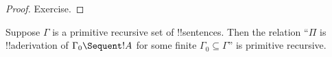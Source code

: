 \documentclass[../../include/open-logic-section]{subfiles}
\begin{document}
\begin{proof}
Exercise.
\end{proof}

\begin{prop}
Suppose $\Gamma$ is a primitive recursive set of !!{sentence}s.  Then
the relation ``$\Pi$ is !!a{derivation} of $\Gamma_0 \Sequent !A$ for
some finite $\Gamma_0 \subseteq \Gamma$'' is primitive recursive.
\end{prop}
\end{document}
